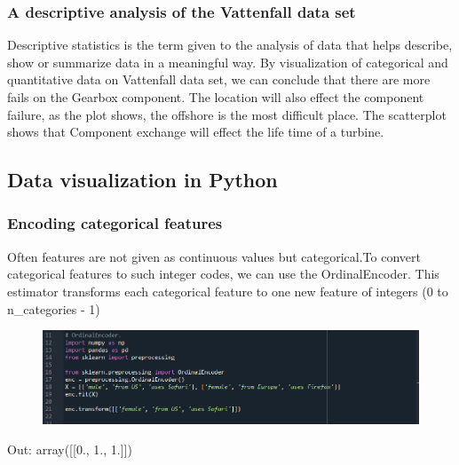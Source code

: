 \documentclass{beamer}
\begin{document}
\begin{frame}[fragile] %
\frametitle{A descriptive analysis of the Vattenfall data set}
Descriptive statistics is the term given to the analysis of data that helps describe, show or summarize data in a meaningful way. By visualization of categorical and quantitative data on Vattenfall data set, we can conclude that there are more fails on the Gearbox component. The location will also effect the component failure, as the plot shows, the offshore is the most difficult place. The scatterplot shows that Component exchange will effect the life time of a turbine.

\end{frame}




\subsection{Data visualization in Python} 
\begin{frame}[fragile] %
\frametitle{Encoding categorical features}

\begin{example} [OrdinalEncoder]
Often features are not given as continuous values but categorical.To convert categorical features to such integer codes, we can use the OrdinalEncoder. This estimator transforms each categorical feature to one new feature of integers (0 to n_categories - 1)

\end{example}
\begin{figure}
\includegraphics[width=0.8\linewidth]{Seminar_3_images/Python/01.png}
\end{figure}
Out: array([[0., 1., 1.]])
\end{frame}
\end{document}
